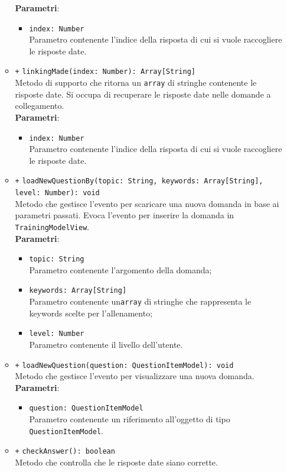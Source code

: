 \begin{itemize}
\begin{itemize}
		\textbf{Parametri}:
		\begin{itemize}
			\item \texttt{index: Number} \\
			Parametro contenente l'indice della risposta di cui si vuole raccogliere le risposte date. 
		\end{itemize}
		\item \texttt{+} \texttt{linkingMade(index: Number): Array[String]} \\
		Metodo di supporto che ritorna un \texttt{array} di stringhe contenente le risposte date. Si occupa di recuperare le risposte date nelle domande a collegamento.\\
		\textbf{Parametri}:
		\begin{itemize}
			\item \texttt{index: Number} \\
			Parametro contenente l'indice della risposta di cui si vuole raccogliere le risposte date. 
		\end{itemize}
		\item \texttt{+} \texttt{loadNewQuestionBy(topic: String, keywords: Array[String], level: Number): void} \\
		Metodo che gestisce l'evento per scaricare una nuova domanda in base ai parametri passati. Evoca l'evento per inserire la domanda in \texttt{TrainingModelView}. \\
		\textbf{Parametri}:
		\begin{itemize}
			\item \texttt{topic: String} \\
			Parametro contenente l'argomento della domanda;
			\item \texttt{keywords: Array[String]} \\
			Parametro contenente un\texttt{array} di stringhe che rappresenta le keywords scelte per l'allenamento;
			\item \texttt{level: Number} \\
			Parametro contenente il livello dell'utente.
		\end{itemize}
		\item \texttt{+} \texttt{loadNewQuestion(question: QuestionItemModel): void} \\
		Metodo che gestisce l'evento per visualizzare una nuova domanda. \\
		\textbf{Parametri}:
		\begin{itemize}
			\item \texttt{question: QuestionItemModel} \\
			Parametro contenente un riferimento all'oggetto di tipo \texttt{QuestionItemModel}.
		\end{itemize}
		\item \texttt{+} \texttt{checkAnswer(): boolean} \\ 
		Metodo che controlla che le risposte date siano corrette.
	\end{itemize}
\end{itemize}

